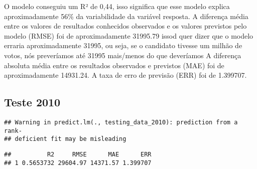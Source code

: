 \documentclass[]{article}
\newenvironment{Shaded}{\begin{snugshade}}{\end{snugshade}}
\newcommand{\KeywordTok}[1]{\textcolor[rgb]{0.13,0.29,0.53}{\textbf{#1}}}
\newcommand{\DataTypeTok}[1]{\textcolor[rgb]{0.13,0.29,0.53}{#1}}
\newcommand{\DecValTok}[1]{\textcolor[rgb]{0.00,0.00,0.81}{#1}}
\newcommand{\StringTok}[1]{\textcolor[rgb]{0.31,0.60,0.02}{#1}}
\newcommand{\OperatorTok}[1]{\textcolor[rgb]{0.81,0.36,0.00}{\textbf{#1}}}
\newcommand{\NormalTok}[1]{#1}
\begin{document}
O modelo conseguiu um R² de 0,44, isso significa que esse modelo explica
aproximadamente 56\% da variabilidade da variável resposta. A diferença
média entre os valores de resultados conhecidos observados e os valores
previstos pelo modelo (RMSE) foi de aproximadamente 31995.79 issod quer
dizer que o modelo erraria aproximadamente 31995, ou seja, se o
candidato tivesse um milhão de votos, nós preveríamos até 31995
mais/menos do que deveríamos A diferença absoluta média entre os
resultados observados e previstos (MAE) foi de aproximadamente 14931.24.
A taxa de erro de previsão (ERR) foi de 1.399707.

\subsection{Teste 2010}\label{teste-2010}

\begin{Shaded}
\end{Shaded}

\begin{verbatim}
## Warning in predict.lm(., testing_data_2010): prediction from a rank-
## deficient fit may be misleading
\end{verbatim}

\begin{Shaded}
\end{Shaded}

\begin{verbatim}
##          R2     RMSE      MAE      ERR
## 1 0.5653732 29604.97 14371.57 1.399707
\end{verbatim}
\end{document}
